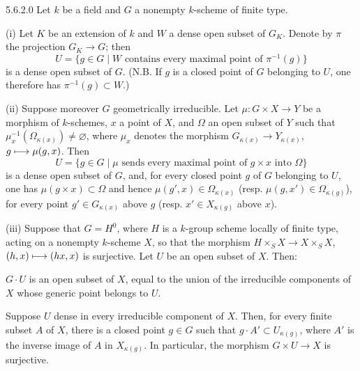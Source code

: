 \begin{lemma}{5.6.2.0}\label{VIB.5.6.2.0}
Let $k$ be a field and $G$ a nonempty $k$-scheme of finite type.

(i) Let $K$ be an extension of $k$ and $W$ a dense open subset of $G_K$. Denote by $\pi$ the projection $G_K\to G$; then
\[
U=\{g\in G\mid W\text{ contains every maximal point of }\pi^{-1}(g)\}
\]
is a dense open subset of $G$. (N.B. If $g$ is a closed point of $G$ belonging to $U$, one therefore has $\pi^{-1}(g)\subset W$.)

(ii) Suppose moreover $G$ geometrically irreducible. Let $\mu:G\times X\to Y$ be a morphism of $k$-schemes, $x$ a point of $X$, and $\Omega$ an open subset of $Y$ such that $\mu_x^{-1}(\Omega_{\kappa(x)})\ne\varnothing$, where $\mu_x$ denotes the morphism $G_{\kappa(x)}\to Y_{\kappa(x)}$, $g\longmapsto\mu(g,x)$. Then
\[
U=\{g\in G\mid\mu\text{ sends every maximal point of }g\times x\text{ into }\Omega\}
\]
is a dense open subset of $G$, and, for every closed point $g$ of $G$ belonging to $U$, one has $\mu(g\times x)\subset\Omega$ and hence $\mu(g',x)\in\Omega_{\kappa(x)}$ (resp. $\mu(g,x')\in\Omega_{\kappa(g)}$), for every point $g'\in G_{\kappa(x)}$ above $g$ (resp. $x'\in X_{\kappa(g)}$ above $x$).

(iii) Suppose that $G=H^0$, where $H$ is a $k$-group scheme locally of finite type, acting on a nonempty $k$-scheme $X$, so that the morphism $H\times_SX\to X\times_SX$, $(h,x)\longmapsto(hx,x)$ is surjective. Let $U$ be an open subset of $X$. Then:
\begin{enumeratea}
\item $G\cdot U$ is an open subset of $X$, equal to the union of the irreducible components of $X$ whose generic point belongs to $U$.
\item Suppose $U$ dense in every irreducible component of $X$. Then, for every finite subset $A$ of $X$, there is a closed point $g\in G$ such that $g\cdot A'\subset U_{\kappa(g)}$, where $A'$ is the inverse image of $A$ in $X_{\kappa(g)}$. In particular, the morphism $G\times U\to X$ is surjective.
\end{enumeratea}
\end{lemma}
